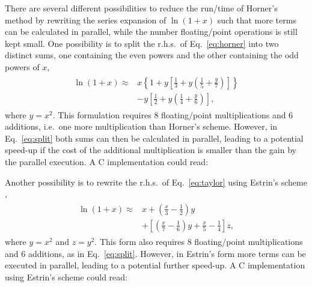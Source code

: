 \documentclass[10pt,DIV16,twocolumn,numbers=noenddot]{scrartcl}
\begin{document}
There are several different possibilities to reduce the run\-/time of
Horner's method by rewriting the series expansion of $\ln(1+x)$ such
that more terms can be calculated in parallel, while the number
floating\-/point operations is still kept small.  One possibility is
to split the r.h.s.\ of Eq.~\eqref{eq:horner} into two distinct sums,
one containing the even powers and the other containing the odd powers
of $x$,
%
\begin{align}
\begin{split}
  \ln(1+x) \approx{}& x \left\{1 + y \left[\frac{1}{3} + y
  \left(\frac{1}{5} + \frac{y}{7}\right)\right]\right\} \\
  &- y\left[\frac{1}{2} + y\left(\frac{1}{4} + \frac{y}{6}\right)\right],
\end{split}\label{eq:split}%
\end{align}
%
where $y=x^2$.  This formulation requires 8 floating\-/point
multiplications and 6 additions, i.e.\ one more multiplication than
Horner's scheme.  However, in Eq.~\eqref{eq:split} both sums can then
be calculated in parallel, leading to a potential speed-up if the cost
of the additional multiplication is smaller than the gain by the
parallel execution.  A C implementation could read:
%

%
Another possibility is to rewrite the r.h.s.\ of Eq.~\eqref{eq:taylor}
using Estrin's scheme \cite{estrin},
%
\begin{align}
\begin{split}
  \ln(1+x) \approx{}& x + \left(\frac{x}{3}-\frac{1}{2}\right)
    y \\ &+\left[\left(\frac{x}{7}-\frac{1}{6}\right)
    y+\frac{x}{5}-\frac{1}{4}\right] z,
\end{split}\label{eq:estrin}%
\end{align}
%
where $y=x^2$ and $z=y^2$.  This form also requires 8 floating\-/point
multiplications and 6 additions, as in Eq.~\eqref{eq:split}.  However,
in Estrin's form more terms can be executed in parallel, leading to a
potential further speed-up.  A C implementation using Estrin's scheme
could read:
%

\end{document}
